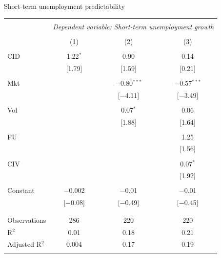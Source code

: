 \documentclass{beamer}
\begin{document}
\scriptsize
\begin{frame}{Short-term unemployment predictability}
\begin{table}[!htbp] \centering 
  \label{} 
\begin{tabular}{@{\extracolsep{5pt}}lccc} 
\\[-1.8ex]\hline 
\hline \\[-1.8ex] 
 & \multicolumn{3}{c}{\textit{Dependent variable: Short-term unemployment growth}} \\
\cline{2-4} 
\\[-1.8ex] & (1) & (2) & (3)\\ 
\hline \\[-1.8ex] 
 CID & 1.22$^{*}$ & 0.90 & 0.14 \\ 
  & [1.79] & [1.59] & [0.21] \\ 
  & & & \\ 
 Mkt &  & $-$0.80$^{***}$ & $-$0.57$^{***}$ \\ 
  &  & [$-$4.11] & [$-$3.49] \\ 
  & & & \\ 
 Vol &  & 0.07$^{*}$ & 0.06 \\ 
  &  & [1.88] & [1.64] \\ 
  & & & \\ 
 FU &  &  & 1.25 \\ 
  &  &  & [1.56] \\ 
  & & & \\ 
 CIV &  &  & 0.07$^{*}$ \\ 
  &  &  & [1.92] \\ 
  & & & \\ 
 Constant & $-$0.002 & $-$0.01 & $-$0.01 \\ 
  & [$-$0.08] & [$-$0.49] & [$-$0.45] \\ 
  & & & \\ 
\hline \\[-1.8ex] 
Observations & 286 & 220 & 220 \\ 
R$^{2}$ & 0.01 & 0.18 & 0.21 \\ 
Adjusted R$^{2}$ & 0.004 & 0.17 & 0.19 \\ 
\hline 
\hline \\[-1.8ex] 
\end{tabular} 
\end{table}
\end{frame}


\renewcommand{\arraystretch}{1.00}
\end{document}
